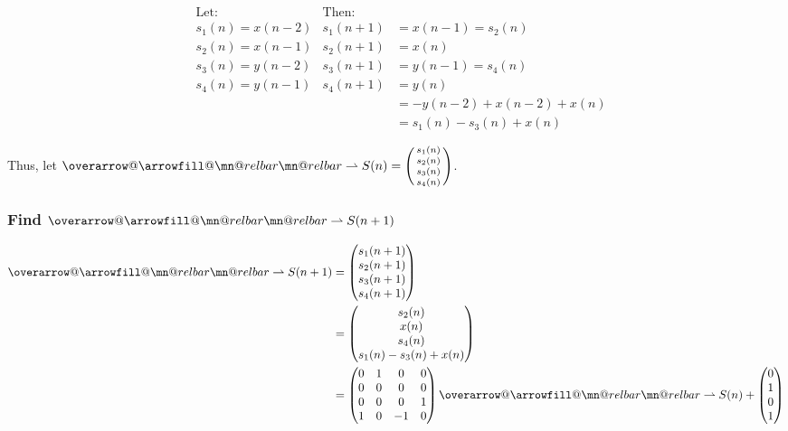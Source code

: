 \documentclass{article}
\makeatletter
\renewcommand{\thesubsubsection}{\thesection.\alph{subsection}.\Roman{subsubsection}}
\DeclareRobustCommand{\overrightharpoon}{\mathpalette{\overarrow@\rightharpoonfill@}}
\def\rightharpoonfill@{\arrowfill@\mn@relbar\mn@relbar\rightharpoonup}
\makeatother
\begin{document}
\begin{align*}
       &\text{Let:}& \text{Then:} \\
       &s_1(n) = x(n - 2) &s_1(n + 1) &= x(n - 1) = s_2(n) \\
       &s_2(n) = x(n - 1) &s_2(n + 1) &= x(n) \\
       &s_3(n) = y(n - 2) &s_3(n + 1) &= y(n - 1) = s_4(n) \\
       &s_4(n) = y(n - 1) &s_4(n + 1) &= y(n) \\
       & & &= -y(n - 2) + x(n - 2) + x(n) \\
       & & &= s_1(n) - s_3(n) + x(n)
\end{align*}

Thus, let $\overrightharpoon{S(n)} = \begin{psmallmatrix} s_1(n) \\ s_2(n) \\ s_3(n) \\ s_4(n) \end{psmallmatrix}$.

\subsubsection[~\thesubsubsection]{Find $\overrightharpoon{S(n + 1)}$}

\begin{align*}
	\overrightharpoon{S(n+1)} &= \begin{pmatrix} s_1(n + 1) \\ s_2(n + 1) \\ s_3(n + 1) \\ s_4(n + 1) \end{pmatrix} \\
	&= \begin{pmatrix} s_2(n) \\ x(n) \\ s_4(n) \\ s_1(n) - s_3(n) + x(n) \end{pmatrix} \\
	&= \begin{pmatrix} 0 & 1 & 0 & 0 \\ 0 & 0 & 0 & 0 \\ 0 & 0 & 0 & 1 \\ 1 & 0 & -1 & 0 \end{pmatrix}\overrightharpoon{S(n)} + \begin{pmatrix} 0 \\ 1 \\ 0 \\ 1 \end{pmatrix}
\end{align*}
\end{document}
